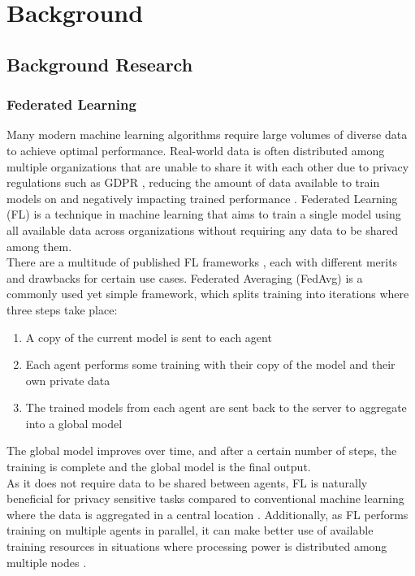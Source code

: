 \chapter{Background}
\section{Background Research}
\subsection{Federated Learning}
Many modern machine learning algorithms require large volumes of diverse data to achieve optimal performance. Real-world data is often distributed among multiple organizations that are unable to share it with each other due to privacy regulations such as GDPR \cite{gdpr}, reducing the amount of data available to train models on and negatively impacting trained performance \cite{data_volume}. Federated Learning (FL) \cite{survey_on_fed_learning} is a technique in machine learning that aims to train a single model using all available data across organizations without requiring any data to be shared among them. \\

There are a multitude of published FL frameworks \cite{fed_table_survey}, each with different merits and drawbacks for certain use cases. Federated Averaging (FedAvg) \cite{fed_learning} is a commonly used yet simple framework, which splits training into iterations where three steps take place:
\begin{enumerate}
	\item A copy of the current model is sent to each agent
	\item Each agent performs some training with their copy of the model and their own private data
	\item The trained models from each agent are sent back to the server to aggregate into a global model
\end{enumerate}
The global model improves over time, and after a certain number of steps, the training is complete and the global model is the final output. \\

As it does not require data to be shared between agents, FL is naturally beneficial for privacy sensitive tasks compared to conventional machine learning where the data is aggregated in a central location \citeme. Additionally, as FL performs training on multiple agents in parallel, it can make better use of available training resources in situations where processing power is distributed among multiple nodes \citeme.

